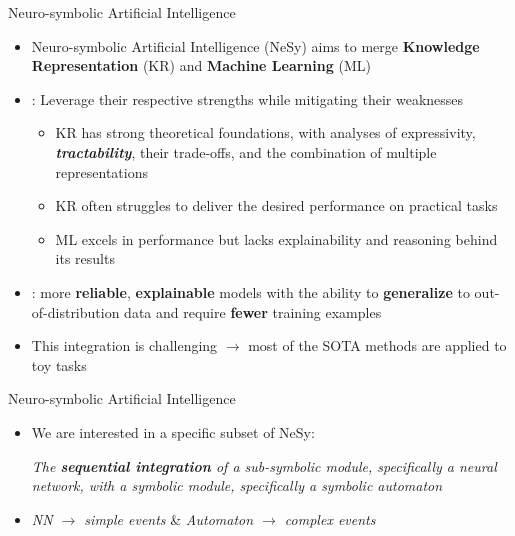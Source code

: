 \documentclass[10pt, aspectratio=169]{beamer}
\begin{document}
\begin{frame}{Neuro-symbolic Artificial Intelligence}
    \begin{itemize}
        \setlength{\itemsep}{12pt}
        \item Neuro-symbolic Artificial Intelligence (NeSy) aims to merge \textbf{Knowledge Representation} (KR) and \textbf{Machine Learning} (ML)
        \item {}: Leverage their respective strengths while mitigating their weaknesses
        \vspace{0.6em}
        \begin{itemize}
            \setlength{\itemsep}{4pt}
                \item KR has \textcolor{green!70!black}{strong theoretical foundations}, with analyses of expressivity, \textbf{\textit{tractability}}, their trade-offs, and the combination of multiple representations
                \item KR often struggles to deliver the desired  \textcolor{red!90!black}{performance} on practical tasks
                \item ML excels in \textcolor{green!70!black}{performance} but lacks \textcolor{red!90!black}{explainability} and reasoning behind its results
            \end{itemize}
        \item {}: more \textbf{reliable}, \textbf{explainable} models with the ability to \textbf{generalize} to out-of-distribution data and require \textbf{fewer} training examples
        \item This integration is challenging $\rightarrow$ most of the SOTA methods are applied to toy tasks
    \end{itemize}
\end{frame}

\begin{frame}{Neuro-symbolic Artificial Intelligence}
    \begin{itemize}
        \setlength{\itemsep}{12pt}
        \item We are interested in a specific subset of NeSy:
        \vspace{1em}
        \begin{center}
            \textit{The \textbf{sequential integration} of a sub-symbolic module, specifically a neural network, with a symbolic module, specifically a symbolic automaton}
        \end{center}
        \item {} \textit{NN $\rightarrow$ simple events} \&  \textit{Automaton $\rightarrow$ complex events}
    \end{itemize}
\end{frame}
\end{document}
